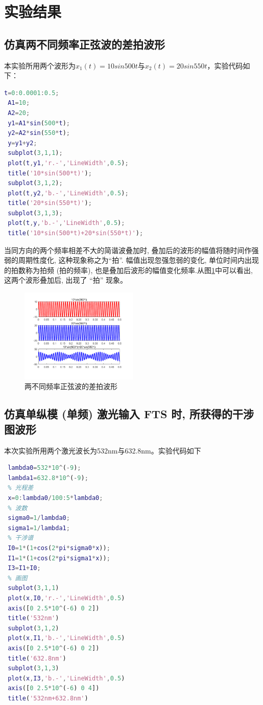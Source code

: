 \documentclass[conference]{IEEEtran}
\begin{document}
\section{实验结果}
\subsection{仿真两不同频率正弦波的差拍波形}
本实验所用两个波形为$x_1(t) = 10sin500t$与$x_2(t)=20sin550t$，实验代码如下：
{%
\begin{lstlisting}[language=matlab]
 t=0:0.0001:0.5;
 A1=10;
 A2=20;
 y1=A1*sin(500*t);
 y2=A2*sin(550*t);
 y=y1+y2;
 subplot(3,1,1);
 plot(t,y1,'r.‐','LineWidth',0.5);
 title('10*sin(500*t)');
 subplot(3,1,2);
 plot(t,y2,'b.‐','LineWidth',0.5);
 title('20*sin(550*t)');
 subplot(3,1,3);
 plot(t,y,'b.‐','LineWidth',0.5);
 title('10*sin(500*t)+20*sin(550*t)');
\end{lstlisting}
}
当同方向的两个频率相差不大的简谐波叠加时, 叠加后的波形的幅值将随时间作强弱的周期性度化, 这种现象称之为“拍”. 幅值出现忽强忽弱的变化, 单位时间内出现的拍数称为拍频 (拍的频率), 也是叠加后波形的幅值变化频率.从图\ref{pic2}中可以看出, 这两个波形叠加后, 出现了 “拍” 现象。
\begin{figure}[htbp]
    \centerline{\includegraphics[width=0.5\textwidth]{pic2.PNG}}
    \caption{两不同频率正弦波的差拍波形}
    \label{pic2}
\end{figure}

\subsection{仿真单纵模 (单频) 激光输入 FTS 时, 所获得的干涉图波形}
本次实验所用两个激光波长为532nm与632.8nm。实验代码如下
{%
\begin{lstlisting}[language=matlab]
 % 波长
 lambda0=532*10^(-9);
 lambda1=632.8*10^(-9);
 % 光程差
 x=0:lambda0/100:5*lambda0;
 % 波数
 sigma0=1/lambda0;
 sigma1=1/lambda1;
 % 干涉谱
 I0=1*(1+cos(2*pi*sigma0*x));
 I1=1*(1+cos(2*pi*sigma1*x));
 I3=I1+I0;
 % 画图
 subplot(3,1,1)
 plot(x,I0,'r.-','LineWidth',0.5)
 axis([0 2.5*10^(-6) 0 2])
 title('532nm')
 subplot(3,1,2)
 plot(x,I1,'b.-','LineWidth',0.5)
 axis([0 2.5*10^(-6) 0 2])
 title('632.8nm')
 subplot(3,1,3)
 plot(x,I3,'b.-','LineWidth',0.5)
 axis([0 2.5*10^(-6) 0 4])
 title('532nm+632.8nm')
\end{lstlisting}}
\end{document}
